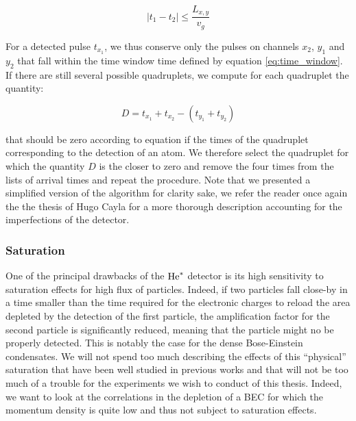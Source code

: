 \begin{equation}
    |t_1-t_2| \leq \frac{L_{x,y}}{v_g}
    \label{eq:time_window}
\end{equation}

\noindent For a detected pulse $t_{x_1}$, we thus conserve only the pulses on channels $x_2$, $y_1$ and $y_2$ that fall within the time window time defined by equation \ref{eq:time_window}. If there are still several possible quadruplets, we compute for each quadruplet the quantity:

\begin{equation}
    D = t_{x_1}+t_{x_2} - (t_{y_1}+t_{y_2})
\end{equation}

\noindent that should be zero according to equation \label{eq:tdet_MCP} if the times of the quadruplet corresponding to the detection of an atom. We therefore select the quadruplet for which the quantity $D$ is the closer to zero and remove the four times from the lists of arrival times and repeat the procedure. Note that we presented a simplified version of the algorithm for clarity sake, we refer the reader once again the the thesis of Hugo Cayla \cite{cayla_these} for a more thorough description accounting for the imperfections of the detector.

\subsubsection{Saturation}

\label{sec:saturation_effect}

One of the principal drawbacks of the $\mathrm{He}^*$ detector is its high sensitivity to saturation effects for high flux of particles. Indeed, if two particles fall close-by in a time smaller than the time required for the electronic charges to reload the area depleted by the detection of the first particle, the amplification factor for the second particle is significantly reduced, meaning that the particle might no be properly detected. This is notably the case for the dense Bose-Einstein condensates. We will not spend too much describing the effects of this ``physical'' saturation that have been well studied in previous works \cite{carcy_these,cayla_these,edgar1992spatial,nogrette2015characterization} and that will not be too much of a trouble for the experiments we wish to conduct of this thesis. Indeed, we want to look at the correlations in the depletion of a BEC for which the momentum density is quite low and thus not subject to saturation effects.

